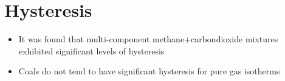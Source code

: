 \documentclass[11pt]{article}
\date{\today}
\title{}
\begin{document}
\tableofcontents

\section{Hysteresis}
\label{sec:orgc6d631a}

\begin{itemize}
\item It was found that multi-component methane+carbondioxide mixtures exhibited significant levels of hysteresis \cite{Clarkson1997}

\item Coals do not tend to have significant hysteresis for pure gas isotherms \cite{Crosdale1998}
\end{itemize}
\end{document}
